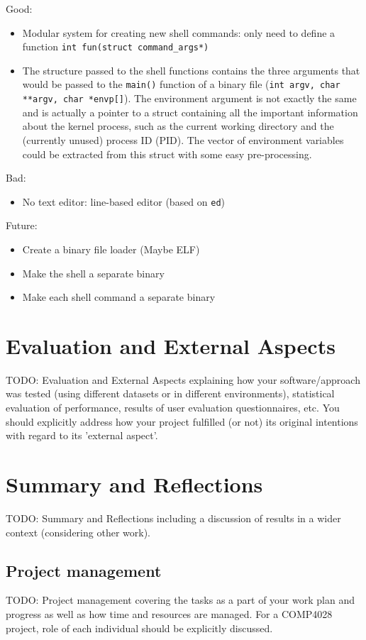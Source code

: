 \documentclass{article}
\begin{document}
Good:
\begin{itemize}
    \item Modular system for creating new shell commands: only need to define a
        function \texttt{int fun(struct command\_args*)}
    \item The structure passed to the shell functions contains the three
        arguments that would be passed to the \texttt{main()} function of a
        binary file (\texttt{int argv, char **argv, char *envp[]}). The
        environment argument is not exactly the same and is actually a pointer
        to a struct containing all the important information about the kernel
        process, such as the current working directory and the (currently
        unused) process ID (PID). The vector of environment variables could be
        extracted from this struct with some easy pre-processing.
\end{itemize}
Bad:
\begin{itemize}
    \item No text editor: line-based editor (based on \texttt{ed})
\end{itemize}
Future:
\begin{itemize}
    \item Create a binary file loader (Maybe ELF)
    \item Make the shell a separate binary
    \item Make each shell command a separate binary
\end{itemize}

\section{Evaluation and External Aspects}
TODO: Evaluation and External Aspects explaining how your software/approach was
tested (using different datasets or in different environments), statistical
evaluation of performance, results of user evaluation questionnaires, etc. You
should explicitly address how your project fulfilled (or not) its original
intentions with regard to its 'external aspect'.
\section{Summary and Reflections}
TODO: Summary and Reflections including a discussion of results in a wider
context (considering other work).

\subsection{Project management}
TODO: Project management covering the tasks as a part of your work plan and
progress as well as how time and resources are managed. For a COMP4028 project,
role of each individual should be explicitly discussed.
\end{document}
